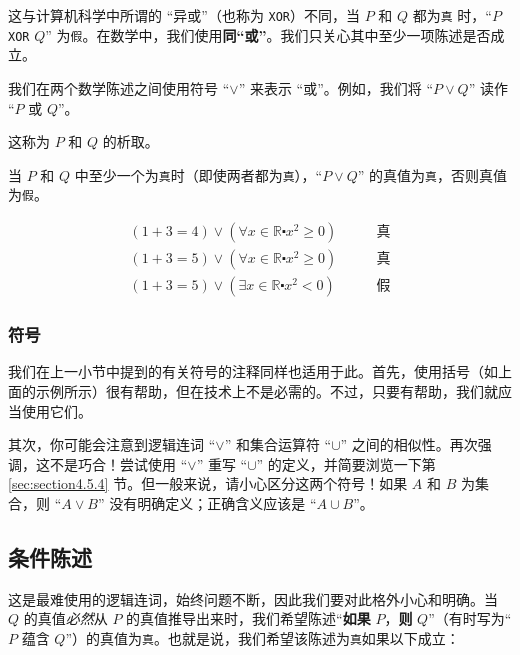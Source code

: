 这与计算机科学中所谓的 ``异或''（也称为 \verb|XOR|）不同，当 $P$ 和 $Q$ 都为\verb|真| 时，``$P$ \verb|XOR| $Q$'' 为\verb|假|。在数学中，我们使用\textbf{同``或''}。我们只关心其中至少一项陈述是否成立。

\begin{definition}
    我们在两个数学陈述之间使用符号 ``$\lor$'' 来表示 ``或''。例如，我们将 ``$P \lor Q$'' 读作 ``$P$ 或 $Q$''。

    这称为 $P$ 和 $Q$ 的析取。

    当 $P$ 和 $Q$ 中至少一个为\verb|真|时（即使两者都为\verb|真|），``$P \lor Q$'' 的真值为\verb|真|，否则真值为\verb|假|。
\end{definition}

\begin{example}
    \begin{align*}
        (1 + 3 = 4) \lor (\forall x \in \mathbb{R} \centerdot x^2 \ge 0) \qquad &\text{真} \\
        (1 + 3 = 5) \lor (\forall x \in \mathbb{R} \centerdot x^2 \ge 0) \qquad &\text{真} \\
        (1 + 3 = 5) \lor (\exists x \in \mathbb{R} \centerdot x^2 < 0)   \qquad &\text{假}
    \end{align*}
\end{example}

\subsubsection*{符号}

我们在上一小节中提到的有关符号的注释同样也适用于此。首先，使用括号（如上面的示例所示）很有帮助，但在技术上不是必需的。不过，只要有帮助，我们就应当使用它们。

其次，你可能会注意到逻辑连词 ``$\lor$'' 和集合运算符 ``$\cup$'' 之间的相似性。再次强调，这不是巧合！尝试使用 ``$\lor$'' 重写 ``$\cup$'' 的定义，并简要浏览一下第 \ref{sec:section4.5.4} 节。但一般来说，请小心区分这两个符号！如果 $A$ 和 $B$ 为集合，则 ``$A \lor B$'' 没有明确定义；正确含义应该是 ``$A \cup B$''。

\subsection{条件陈述}

这是最难使用的逻辑连词，始终问题不断，因此我们要对此格外小心和明确。当 $Q$ 的真值\emph{必然}从 $P$ 的真值推导出来时，我们希望陈述``\textbf{如果} $P$，\textbf{则} $Q$''（有时写为``$P$ 蕴含 $Q$''）的真值为\verb|真|。也就是说，我们希望该陈述为\verb|真|如果以下成立：

